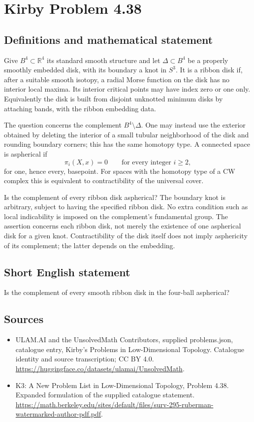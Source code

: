 \documentclass[11pt,a4paper]{article}
\begin{document}
\section*{Kirby Problem 4.38}\label{statement}

\subsection{Definitions and mathematical statement}
Give $B^4\subset\mathbb R^4$ its standard smooth structure and let
$\Delta\subset B^4$ be a properly smoothly embedded disk, with its
boundary a knot in $S^3$. It is a ribbon disk if, after a suitable
smooth isotopy, a radial Morse function on the disk has no interior
local maxima. Its interior critical points may have index zero or
one only. Equivalently the disk is built from disjoint unknotted
minimum disks by attaching bands, with the ribbon embedding data.

The question concerns the complement $B^4\setminus\Delta$. One may
instead use the exterior obtained by deleting the interior of a small
tubular neighborhood of the disk and rounding boundary corners; this
has the same homotopy type. A connected space is aspherical if
\[
 \pi_i(X,x)=0\qquad\text{for every integer }i\ge2,
\]
for one, hence every, basepoint. For spaces with the homotopy type
of a CW complex this is equivalent to contractibility of the universal
cover.

Is the complement of every ribbon disk aspherical? The boundary knot
is arbitrary, subject to having the specified ribbon disk. No extra
condition such as local indicability is imposed on the complement's
fundamental group. The assertion concerns each ribbon disk, not merely
the existence of one aspherical disk for a given knot.
Contractibility of the disk itself does not imply asphericity of its
complement; the latter depends on the embedding.
\subsection{Short English statement}
Is the complement of every smooth ribbon disk in the four-ball aspherical?
\subsection{Sources}
\begin{itemize}
\item[S1] ULAM.AI and the UnsolvedMath Contributors, supplied problems.json, catalogue entry, Kirby's Problems in Low-Dimensional Topology. Catalogue identity and source transcription; CC BY 4.0.
\url{https://huggingface.co/datasets/ulamai/UnsolvedMath}.
\item[S2] K3: A New Problem List in Low-Dimensional Topology, Problem 4.38. Expanded formulation of the supplied catalogue statement.
\url{https://math.berkeley.edu/sites/default/files/surv-295-ruberman-watermarked-author-pdf.pdf}.
\end{itemize}
\end{document}
